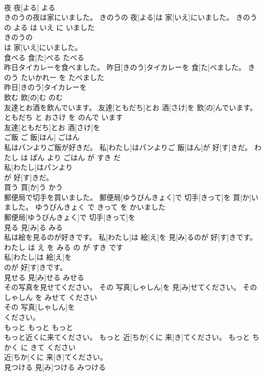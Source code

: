 \documentclass[8pt]{extreport}
\begin{document}
\begin{CJK}{UTF8}{min}
\\	夜	夜[よる]	よる	
\\	きのうの夜は家にいました。	きのうの 夜[よる]は 家[いえ]にいました。	きのう の よる は いえ に いました	
\\	きのうの
\\	は 家[いえ]にいました。			
\\	食べる	食[た]べる	たべる	
\\	昨日タイカレーを食べました。	昨日[きのう]タイカレーを 食[た]べました。	きのう たいかれー を たべました	
\\	昨日[きのう]タイカレーを
\\	飲む	飲[の]む	のむ	
\\	友達とお酒を飲んでいます。	友達[ともだち]とお 酒[さけ]を 飲[の]んでいます。	ともだち と おさけ を のんで います	
\\	友達[ともだち]とお 酒[さけ]を
\\	ご飯	ご 飯[はん]	ごはん	
\\	私はパンよりご飯が好きだ。	私[わたし]はパンよりご 飯[はん]が 好[す]きだ。	わたし は ぱん より ごはん が すき だ	
\\	私[わたし]はパンより
\\	が 好[す]きだ。			
\\	買う	買[か]う	かう	
\\	郵便局で切手を買いました。	郵便局[ゆうびんきょく]で 切手[きって]を 買[か]いました。	ゆうびんきょく で きって を かいました	
\\	郵便局[ゆうびんきょく]で 切手[きって]を
\\	見る	見[み]る	みる	
\\	私は絵を見るのが好きです。	私[わたし]は 絵[え]を 見[み]るのが 好[す]きです。	わたし は え を みる の が すき です	
\\	私[わたし]は 絵[え]を
\\	のが 好[す]きです。			
\\	見せる	見[み]せる	みせる	
\\	その写真を見せてください。	その 写真[しゃしん]を 見[み]せてください。	その しゃしん を みせて ください	
\\	その 写真[しゃしん]を
\\	ください。			
\\	もっと	もっと	もっと	
\\	もっと近くに来てください。	もっと 近[ちか]くに 来[き]てください。	もっと ちかく に きて ください	
\\	近[ちか]くに 来[き]てください。			
\\	見つける	見[み]つける	みつける	

\end{CJK}
\end{document}
